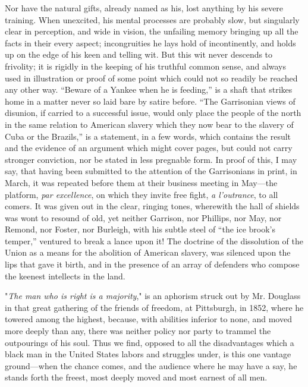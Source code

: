 Nor have the natural gifts, already named as his, lost anything by his
severe training. When unexcited, his mental processes are probably slow,
but singularly clear in perception, and wide in vision, the unfailing
memory bringing up all the facts in their every aspect; incongruities he
lays hold of incontinently, and holds up on the edge of his keen and
telling wit. But this wit never descends to frivolity; it is rigidly in
the keeping of his truthful common sense, and always used in
illustration or proof of some point which could not so readily be
reached any other way. ``Beware of a Yankee when he is feeding,'' is a
shaft that strikes home in a matter never so laid bare by satire before.
``The Garrisonian views of disunion, if carried to a successful issue,
would only place the people of the north in the same relation to
American slavery which they now bear to the slavery of Cuba or the
Brazils,'' is a statement, in a few words, which contains the result and
the evidence of an argument which might cover pages, but could not carry
stronger conviction, nor be stated in less pregnable form. In proof of
this, I may say, that having been submitted to the attention of the
Garrisonians in print, in March, it was repeated before them at their
business meeting in May---the platform, \emph{par excellence}, on which
they invite free fight, \emph{a l'outrance}, to all comers. It was given
out in the clear, ringing tones, wherewith the hall of shields was wont
to resound of old, yet neither Garrison, nor Phillips, nor May, nor
Remond, nor Foster, nor Burleigh, with his subtle steel of ``the ice
brook's temper,'' ventured to break a lance upon it! The doctrine of the
dissolution of the Union as a means for the abolition of American
slavery, was silenced upon the lips that gave it birth, and in the
presence {\protect\hypertarget{xxvii}{}{}}of an array of defenders who
compose the keenest intellects in the land.

"\emph{The man who is right is a majority}," is an aphorism struck out
by Mr. Douglass in that great gathering of the friends of freedom, at
Pittsburgh, in 1852, where he towered among the highest, because, with
abilities inferior to none, and moved more deeply than any, there was
neither policy nor party to trammel the outpourings of his soul. Thus we
find, opposed to all the disadvantages which a black man in the United
States labors and struggles under, is this one vantage ground---when the
chance comes, and the audience where he may have a say, he stands forth
the freest, most deeply moved and most earnest of all men.

